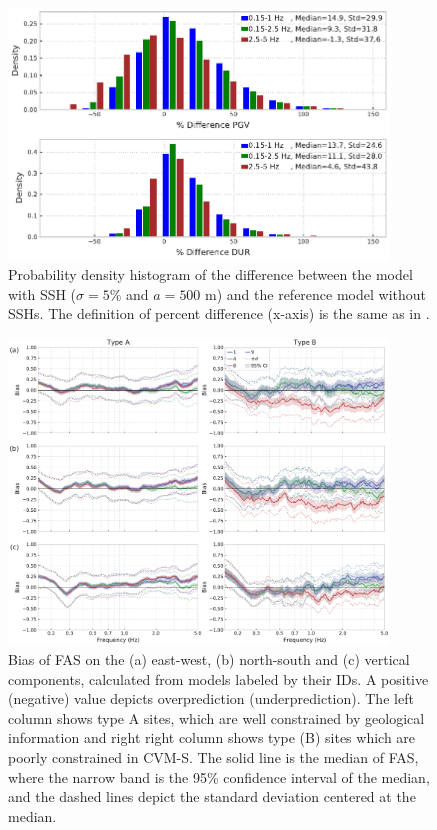 \begin{figure}[!ht]
  \centering
  \includegraphics[width=0.9\textwidth,height=0.9\textheight,keepaspectratio]{figures/figure_highf_12.pdf}
  \caption{Probability density histogram of the difference between the model with SSH ($\sigma = 5\%$ and $a = 500$ m) and the reference model without SSHs. The definition of percent difference (x-axis) is the same as in .
  }
  \label{fig:highf-12}
\end{figure}
\clearpage

\begin{figure}[!ht]
  \centering
  \includegraphics[width=0.9\textwidth,height=0.9\textheight,keepaspectratio]{figures/figure_highf_13.pdf}
  \caption{Bias of FAS on the (a) east-west, (b) north-south and (c) vertical components, calculated from models labeled by their IDs. A positive (negative) value depicts overprediction (underprediction). The left column shows type A sites, which are well constrained by geological information and right right column shows type (B) sites which are poorly constrained in CVM-S. The solid line is the median of FAS, where the narrow band is the 95\% confidence interval of the median, and the dashed lines depict the standard deviation centered at the median.
  }
  \label{fig:highf-13}
\end{figure}
\clearpage

